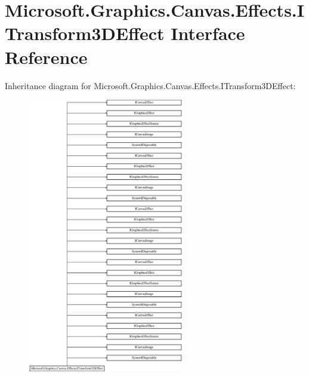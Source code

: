 \hypertarget{interface_microsoft_1_1_graphics_1_1_canvas_1_1_effects_1_1_i_transform3_d_effect}{}\section{Microsoft.\+Graphics.\+Canvas.\+Effects.\+I\+Transform3\+D\+Effect Interface Reference}
\label{interface_microsoft_1_1_graphics_1_1_canvas_1_1_effects_1_1_i_transform3_d_effect}
Inheritance diagram for Microsoft.\+Graphics.\+Canvas.\+Effects.\+I\+Transform3\+D\+Effect\+:\begin{figure}[H]
\begin{center}
\leavevmode
\includegraphics[height=12.000000cm]{interface_microsoft_1_1_graphics_1_1_canvas_1_1_effects_1_1_i_transform3_d_effect}
\end{center}
\end{figure}
